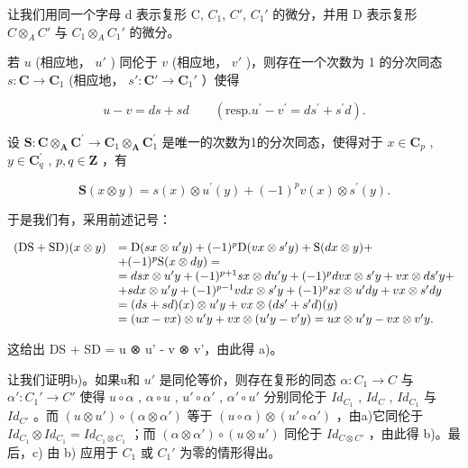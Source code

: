让我们用同一个字母 d 表示复形 C, \(C_{1}\), \(C'\), \(C_{1}'\) 的微分，并用 D 表示复形 \(C \otimes_{A} C'\) 与 \(C_{1} \otimes_{A} C_{1}'\) 的微分。

若 \(u\) (相应地， \(u'\) ) 同伦于 \(v\) (相应地， \(v'\) )，则存在一个次数为 1 的分次同态 \(s: \mathbf{C} \to \mathbf{C}_1\) (相应地， \(s': \mathbf{C}' \to \mathbf{C}_1'\) ）使得

\[
u - v = d s + s d \qquad (\mathrm{resp.} u ^ {\prime} - v ^ {\prime} = d s ^ {\prime} + s ^ {\prime} d).\tag{2}
\]

设 \(\mathbf{S}:\mathbf{C}\otimes_{\mathbf{A}}\mathbf{C}^{\prime}\to \mathbf{C}_{1}\otimes_{\mathbf{A}}\mathbf{C}_{1}^{\prime}\) 是唯一的次数为1的分次同态，使得对于 \(x\in \mathbf{C}_p\) , \(y\in \mathbf{C}_q^\prime\) , \(p,q\in \mathbf{Z}\) ，有

\[
\mathbf {S} (x \otimes y) = s (x) \otimes u ^ {\prime} (y) + (- 1) ^ {p} v (x) \otimes s ^ {\prime} (y).\tag{3}
\]

于是我们有，采用前述记号：

\[
\begin{array}{r l} (\mathrm{DS} + \mathrm{SD}) (x \otimes y) & = \mathrm{D} (s x \otimes u ^ {\prime} y) + (- 1) ^ {p} \mathrm{D} (v x \otimes s ^ {\prime} y) + \mathrm{S} (d x \otimes y) + \\ & + (- 1) ^ {p} \mathrm{S} (x \otimes d y) = \\ & = d s x \otimes u ^ {\prime} y + (- 1) ^ {p + 1} s x \otimes d u ^ {\prime} y + (- 1) ^ {p} d v x \otimes s ^ {\prime} y + v x \otimes d s ^ {\prime} y + \\ & + s d x \otimes u ^ {\prime} y + (- 1) ^ {p - 1} v d x \otimes s ^ {\prime} y + (- 1) ^ {p} s x \otimes u ^ {\prime} d y + v x \otimes s ^ {\prime} d y \\ & = (d s + s d) (x) \otimes u ^ {\prime} y + v x \otimes (d s ^ {\prime} + s ^ {\prime} d) (y) \\ & = (u x - v x) \otimes u ^ {\prime} y + v x \otimes (u ^ {\prime} y - v ^ {\prime} y) = u x \otimes u ^ {\prime} y - v x \otimes v ^ {\prime} y. \end{array}
\]

这给出 DS + SD = u ⊗ u' - v ⊗ v'，由此得 a)。

让我们证明b)。如果u和 \(u'\) 是同伦等价，则存在复形的同态 \(\alpha: C_{1} \to C\) 与 \(\alpha': C_{1}' \to C'\) 使得 \(u \circ \alpha\) , \(\alpha \circ u\) , \(u' \circ \alpha'\) , \(\alpha' \circ u'\) 分别同伦于 \(Id_{C_{1}}\) , \(Id_{C}\) , \(Id_{C_{1}}\) 与 \(Id_{C'}\) 。而 \((u \otimes u') \circ (\alpha \otimes \alpha')\) 等于 \((u \circ \alpha) \otimes (u' \circ \alpha')\) ，由a)它同伦于 \(Id_{C_{1}} \otimes Id_{C_{1}} = Id_{C_{1} \otimes C_{1}}\) ；而 \((\alpha \otimes \alpha') \circ (u \otimes u')\) 同伦于 \(Id_{C \otimes C'}\) ，由此得 b)。最后，c) 由 b) 应用于 \(C_{1}\) 或 \(C_{1}'\) 为零的情形得出。

